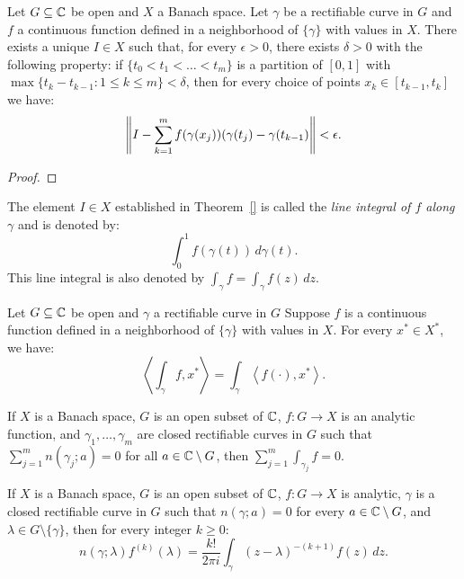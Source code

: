\begin{theorem}
	Let $G \subseteq \mathbb{C}$ be open and $X$ a Banach space. Let $\gamma$ be a rectifiable curve in $G$ and $f$ a continuous function defined in a neighborhood of $\{\gamma\}$ with values in $X$. There exists a unique $I \in X$ such that, for every $\epsilon > 0$, there exists $\delta > 0$ with the following property: if $\{t_0 < t_1 < \ldots < t_m\}$ is a partition of $[0,1]$ with $\max \{t_k - t_{k-1} : 1 \leq k \leq m\} < \delta$, then for every choice of points $x_k \in [t_{k-1},t_k]$ we have:
	\[
	\left\lVert I - \sum_{k=1}^{m} f(\gamma(x_j))(\gamma(t_j) - \gamma(t_{k-1}) \right\rVert < \epsilon.
	\] 
\end{theorem}
{\color{red}
\begin{proof}
		
\end{proof}}

\begin{definition}
	The element $I \in X$ established in Theorem~\ref{} is called the \emph{line integral of $f$ along $\gamma$} and is denoted by:
	\[
		\int_{0}^{1} f(\gamma(t))\,d\gamma(t).
	\] 
	This line integral is also denoted by $\int_{\gamma}^{} f = \int_{\gamma}^{} f(z)\,dz$.
\end{definition}

\begin{proposition}
	Let $G \subseteq \mathbb{C}$ be open and $\gamma$ a rectifiable curve in $G$ Suppose $f$ is a continuous function defined in a neighborhood of $\{\gamma\}$ with values in $X$. For every $x^\ast \in X^\ast$, we have:
	\[
		\left<\int_{\gamma}^{} f,x^\ast \right> = \int_{\gamma}^{} \left<f(\cdot), x^\ast \right>.
	\] 
\end{proposition}

\begin{theorem}
	If $X$ is a Banach space, $G$ is an open subset of $\mathbb{C}$, $f:G \rightarrow X$ is an analytic function, and $\gamma_1,\ldots ,\gamma_m$ are closed rectifiable curves in $G$ such that $\sum_{j=1}^{m} n(\gamma_j ; a) = 0$ for all $a \in \mathbb{C} \setminus G$, then $\sum_{j=1}^{m}  \int_{\gamma_j}^{} f = 0$.
\end{theorem}

\begin{theorem}
	If $X$ is a Banach space, $G$ is an open subset of $\mathbb{C}$, $f:G \rightarrow X$ is analytic, $\gamma$ is a closed rectifiable curve in $G$ such that $n(\gamma;a) = 0$ for every $a \in \mathbb{C} \setminus G$, and $\lambda \in G \setminus\{\gamma\}$, then for every integer $k \geq 0$:
	\[
		n(\gamma;\lambda)f^{(k)}(\lambda) = \frac{k!}{2\pi i} \int_{\gamma}^{} (z-\lambda)^{-(k+1)}f(z)\,dz.
	\] 
\end{theorem}


